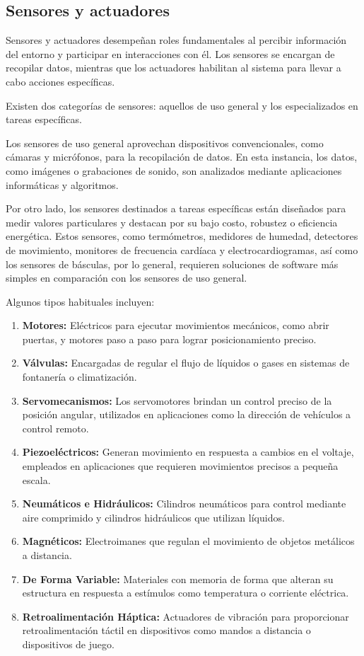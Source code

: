 \documentclass[12pt]{article}
\begin{document}
  \subsection*{Sensores y actuadores}
  Sensores y actuadores desempeñan roles fundamentales al percibir información del entorno y participar en interacciones con él. Los sensores se encargan de recopilar datos, mientras que los actuadores habilitan al sistema para llevar a cabo acciones específicas.

  Existen dos categorías de sensores: aquellos de uso general y los especializados en tareas específicas.

  Los sensores de uso general aprovechan dispositivos convencionales, como cámaras y micrófonos, para la recopilación de datos. En esta instancia, los datos, como imágenes o grabaciones de sonido, son analizados mediante aplicaciones informáticas y algoritmos.

  Por otro lado, los sensores destinados a tareas específicas están diseñados para medir valores particulares y destacan por su bajo costo, robustez o eficiencia energética. Estos sensores, como termómetros, medidores de humedad, detectores de movimiento, monitores de frecuencia cardíaca y electrocardiogramas, así como los sensores de básculas, por lo general, requieren soluciones de software más simples en comparación con los sensores de uso general.

  Algunos tipos habituales incluyen:
  \begin{enumerate}
    \item \textbf{Motores:} Eléctricos para ejecutar movimientos mecánicos, como abrir puertas, y motores paso a paso para lograr posicionamiento preciso.
    \item \textbf{Válvulas:} Encargadas de regular el flujo de líquidos o gases en sistemas de fontanería o climatización.
    \item \textbf{Servomecanismos:} Los servomotores brindan un control preciso de la posición angular, utilizados en aplicaciones como la dirección de vehículos a control remoto.
    \item \textbf{Piezoeléctricos:} Generan movimiento en respuesta a cambios en el voltaje, empleados en aplicaciones que requieren movimientos precisos a pequeña escala.
    \item \textbf{Neumáticos e Hidráulicos:} Cilindros neumáticos para control mediante aire comprimido y cilindros hidráulicos que utilizan líquidos.
    \item \textbf{Magnéticos:} Electroimanes que regulan el movimiento de objetos metálicos a distancia.
    \item \textbf{De Forma Variable:} Materiales con memoria de forma que alteran su estructura en respuesta a estímulos como temperatura o corriente eléctrica.
    \item \textbf{Retroalimentación Háptica:} Actuadores de vibración para proporcionar retroalimentación táctil en dispositivos como mandos a distancia o dispositivos de juego.
  \end{enumerate}
\end{document}

